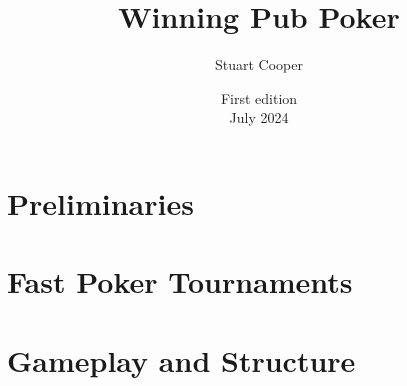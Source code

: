 \documentclass{book}
\begin{document}



\title{Winning Pub Poker}
\author{Stuart Cooper}
\date{First edition\\July 2024}


\maketitle
\tableofcontents

\part{Preliminaries}









\part{Fast Poker Tournaments}







\part{Gameplay and Structure}



\end{document}
